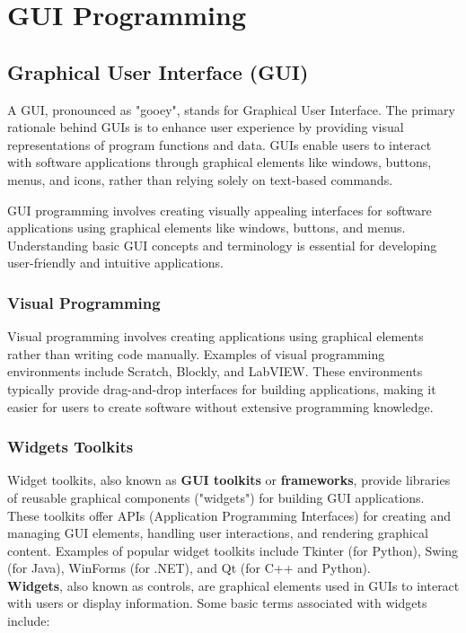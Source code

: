 \section{GUI Programming}

\subsection{Graphical User Interface (GUI)}
A GUI, pronounced as "gooey", stands for Graphical User Interface. The primary rationale behind GUIs is to enhance user experience by providing visual representations of program functions and data. GUIs enable users to interact with software applications through graphical elements like windows, buttons, menus, and icons, rather than relying solely on text-based commands.

GUI programming involves creating visually appealing interfaces for software applications using graphical elements like windows, buttons, and menus. Understanding basic GUI concepts and terminology is essential for developing user-friendly and intuitive applications.

\subsubsection{Visual Programming}
Visual programming involves creating applications using graphical elements rather than writing code manually. Examples of visual programming environments include Scratch, Blockly, and LabVIEW. These environments typically provide drag-and-drop interfaces for building applications, making it easier for users to create software without extensive programming knowledge.

\subsubsection{Widgets Toolkits}
Widget toolkits, also known as \textbf{GUI toolkits} or \textbf{frameworks}, provide libraries of reusable graphical components ("widgets") for building GUI applications. These toolkits offer APIs (Application Programming Interfaces) for creating and managing GUI elements, handling user interactions, and rendering graphical content. Examples of popular widget toolkits include Tkinter (for Python), Swing (for Java), WinForms (for .NET), and Qt (for C++ and Python).\\

\textbf{Widgets}, also known as controls, are graphical elements used in GUIs to interact with users or display information. Some basic terms associated with widgets include:

